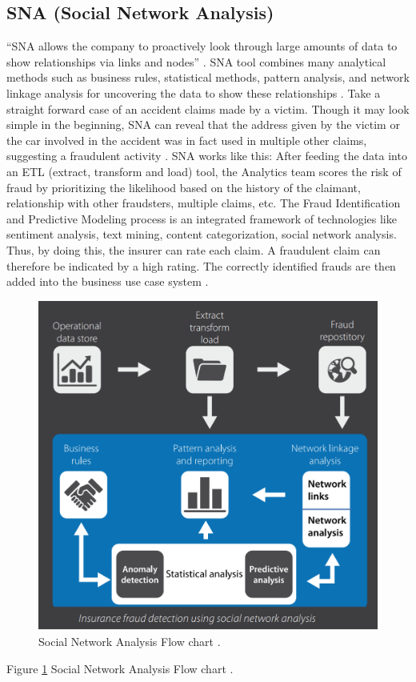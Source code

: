 \documentclass[sigconf]{acmart}
\begin{document}
\subsection{SNA (Social Network Analysis)}
``SNA allows the company to proactively look through large amounts of data to show relationships via links and nodes'' \cite{link9}. SNA tool combines many analytical methods such as business rules, statistical methods, pattern analysis, and network linkage analysis for uncovering the data to show these relationships \cite{link7}. Take a straight forward case of an accident claims made by a victim. Though it may look simple in the beginning, SNA can reveal that the address given by the victim or the car involved in the accident was in fact used in multiple other claims, suggesting a fraudulent activity \cite{link9}. 
SNA works like this: After feeding the data into an ETL (extract, transform and load) tool, the Analytics team scores the risk of fraud by prioritizing the likelihood based on the history of the claimant, relationship with other fraudsters, multiple claims, etc. The Fraud Identification and Predictive Modeling process is an integrated framework of technologies like sentiment analysis, text mining, content categorization, social network analysis. Thus, by doing this, the insurer can rate each claim. A fraudulent claim can therefore be indicated by a high rating. The correctly identified frauds are then added into the business use case system \cite{link9}.
\begin{figure}
  \includegraphics[width=\linewidth]{images/SNA_image1.png}
  \caption{Social Network Analysis Flow chart \cite{link7}.}
  \label{F: Social Network Analysis flowchart}
\end{figure}
Figure \ref{F: Social Network Analysis flowchart} Social Network Analysis Flow chart .\\
\end{document}
